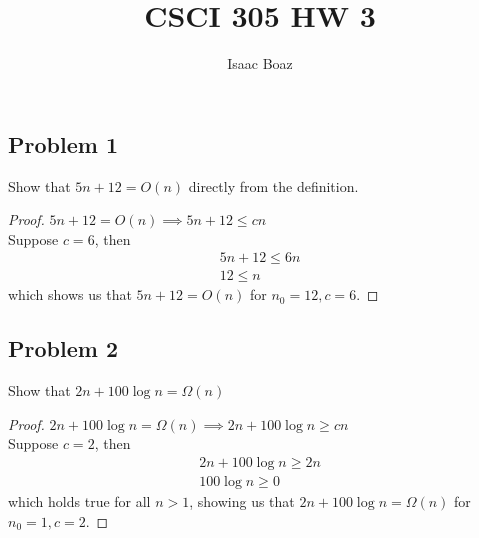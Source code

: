 \documentclass{article}
\title{CSCI 305 HW 3}
\author{Isaac Boaz}
\begin{document}
\maketitle

\subsection*{Problem 1}
Show that \(5n + 12 = O(n)\) directly from the definition.

\begin{proof}
    \(5n + 12 = O(n) \implies 5n + 12 \leq cn\) \\
    Suppose \(c = 6\), then
    \begin{align*}
        5n + 12 \leq 6n \\
        12 \leq n
    \end{align*}
    which shows us that \(5n + 12 = O(n)\) for \(n_0 = 12, c = 6\).
\end{proof}

\subsection*{Problem 2}
Show that \(2n + 100 \log n= \Omega(n)\)
\begin{proof}
    \(2n + 100 \log n = \Omega(n) \implies 2n + 100 \log n \geq cn\) \\
    Suppose \(c = 2\), then
    \begin{align*}
        2n + 100 \log n \geq 2n \\
        100 \log n \geq 0
    \end{align*}
    which holds true for all \(n > 1\), showing us that \(2n + 100 \log n = \Omega(n)\) for \(n_0=1,c=2\).
\end{proof}
\end{document}
